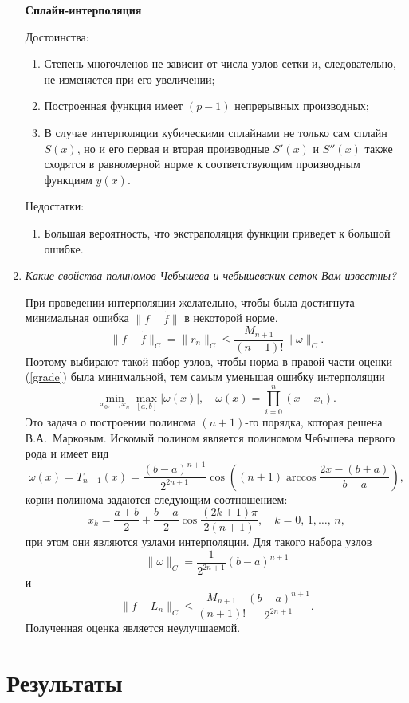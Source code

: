 \documentclass[12pt, a4paper]{article}
\begin{document}
\begin{enumerate}
		\newpage
		\textbf{Сплайн-интерполяция}
		
		Достоинства:
		\begin{enumerate}
			\item Степень многочленов не зависит от числа узлов сетки и, следовательно, не изменяется при его увеличении;
			\item Построенная функция имеет $(p-1)$ непрерывных производных;
			\item В случае интерполяции кубическими сплайнами не только сам сплайн $S(x)$, но и его первая и вторая производные $S'(x)$ и $S''(x)$ также сходятся в равномерной норме к соответствующим производным функциям $y(x)$.
		\end{enumerate}
		Недостатки:
		\begin{enumerate}
			\item Большая вероятность, что экстраполяция функции приведет к большой ошибке.
		\end{enumerate}
		\smallskip
		\item \textit{Какие свойства полиномов Чебышева и чебышевских сеток Вам известны?}
		\smallskip
		
		При проведении интерполяции желательно, чтобы была достигнута минимальная ошибка $\|f-\tilde{f}\|$ в некоторой норме.
		\begin{equation}
			\|f-\tilde{f}\|_C=\|r_n\|_C \le \frac{M_{n+1}}{(n+1)!}\|\omega\|_C.
			\label{grade}
		\end{equation}
		Поэтому выбирают такой набор узлов, чтобы норма в правой части оценки (\ref{grade}) была минимальной, тем самым уменьшая ошибку интерполяции
		\[
		\min_{x_0,\dots,x_n} \max_{[a,b]}|\omega(x)|,\quad
		\omega(x) = \prod_{i=0}^{n}(x-x_i).
		\]
		Это задача о построении полинома $(n+1)$-го порядка, которая решена В.А.~Марковым. Искомый полином является полиномом Чебышева первого рода и имеет вид
		\[
		\omega(x)=T_{n+1}(x) = \frac{(b-a)^{n+1}}{2^{2n+1}}\cos\left((n+1)\arccos\frac{2x-(b+a)}{b-a}\right),
		\]
		корни полинома задаются следующим соотношением:
		\[
		x_k=\frac{a+b}{2}+\frac{b-a}{2}\cos\frac{(2k+1)\pi}{2(n+1)},\quad k=0,\,1,\dots,\,n,
		\]
		при этом они являются узлами интерполяции. Для такого набора узлов
		\[
		\|\omega\|_C=\frac{1}{2^{2n+1}}(b-a)^{n+1}
		\]
		и
		\[
		\|f-L_n\|_C \le \frac{M_{n+1}}{(n+1)!}\frac{(b-a)^{n+1}}{2^{2n+1}}.
		\]
		Полученная оценка является неулучшаемой. 
	\end{enumerate}
	\newpage
	\section{Результаты}
	
\end{document}
